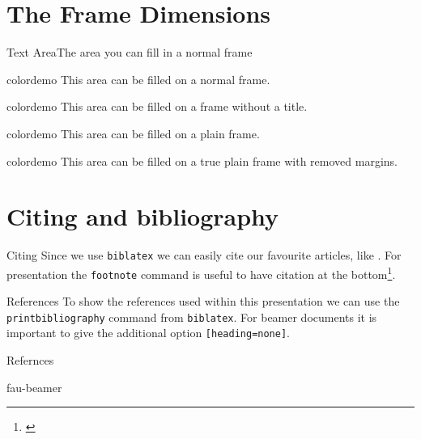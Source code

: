 \section{The Frame Dimensions}
%
%
%
%
\begin{frame}[t]{Text Area}{The area you can fill in a normal frame}

\begin{beamercolorbox}[dp=0pt,sep=0em,wd=\textwidth,ht=\FrameHeight,center]{colordemo}%
This area can be filled on a normal frame.
\vspace{5cm}%
\end{beamercolorbox}%
\end{frame}
%
%
%
\begin{frame}

\begin{beamercolorbox}[dp=0pt,sep=0em,
					   wd=\textwidth,
					   ht=\dimexpr\FrameHeight+\TitleHeight+4mm,center]{colordemo}%
This area can be filled on a frame without a title.
\vspace{5cm}%
\end{beamercolorbox}%
\end{frame}
%
%
%
%
%
\begin{frame}[plain]
\begin{beamercolorbox}[dp=0pt,sep=0em,wd=\textwidth,ht=\paperheight,center]{colordemo}%
This area can be filled on a plain frame.
\vspace{5cm}%
\end{beamercolorbox}%
\end{frame}
%
%
%
%
%
\begin{trueplainframe}
\begin{beamercolorbox}[dp=0pt,sep=0em,wd=\textwidth,ht=\paperheight,center]{colordemo}%
This area can be filled on a true plain frame with removed margins.
\vspace{5cm}%
\end{beamercolorbox}%
\end{trueplainframe}
%
%
%
%
%
\section{Citing and bibliography}
%
%
%
%
%
\begin{frame}{Citing}
Since we use \texttt{biblatex} we can easily cite our favourite articles, like
\cite{bungert2021bregman, bungert2021neural}. For presentation the \texttt{footnote} command is useful to have citation at the bottom\footnote{\cite{bungert2021bregman}}.
\end{frame}
%
%
%
%
%
\begin{frame}{References}
To show the references used within this presentation we can use the \texttt{printbibliography} command from \texttt{biblatex}. For beamer documents it is important to give the additional option \texttt{[heading=none]}.
%
%
%
%
%
\begin{block}{Refernces}
\printbibliography[heading=none]
\end{block}
\end{frame}
%
%
%
%
%
\begin{frame}{fau-beamer}
%
\end{frame}